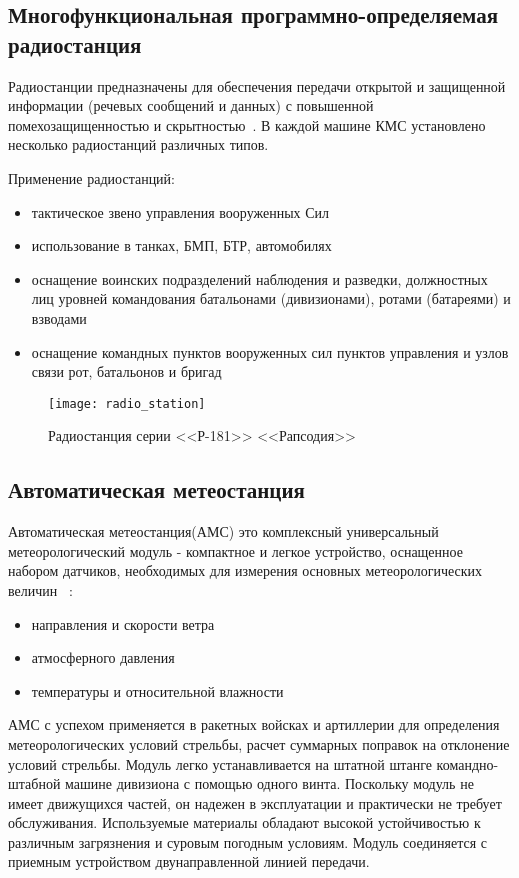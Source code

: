 \subsection{Многофункциональная программно-определяемая радиостанция}
\label{sub:lit_review:radio}

Радиостанции предназначены для обеспечения передачи открытой и защищенной информации (речевых сообщений и данных) с
повышенной помехозащищенностью и скрытностью~\cite{prc9661}.
В каждой машине КМС установлено несколько радиостанций различных типов.

Применение радиостанций:
\begin{itemize}
	\item тактическое звено управления вооруженных Сил
	\item использование в танках, БМП, БТР, автомобилях
	\item оснащение воинских подразделений наблюдения и разведки, должностных лиц уровней командования батальонами (дивизионами), ротами (батареями) и взводами
	\item оснащение командных пунктов вооруженных сил пунктов управления и узлов связи рот, батальонов и бригад
\end{itemize}

\begin{figure}[ht]
	\centering
	\texttt{[image: radio\_station]}
	\caption{Радиостанция серии <<Р-181>> <<Рапсодия>>}
	\label{fig:lit_reiview:meteo:radio_station}
\end{figure}

\subsection{Автоматическая метеостанция}
\label{sub:lit_review:meteo}

Автоматическая метеостанция(АМС) это комплексный универсальный метеорологический модуль - компактное и легкое
устройство, оснащенное набором датчиков, необходимых для измерения основных метеорологических величин ~\cite{wxt530}:
\begin{itemize}
	\item направления и скорости ветра
	\item атмосферного давления
	\item температуры и относительной влажности
\end{itemize}

АМС с успехом применяется в ракетных войсках и артиллерии для определения метеорологических условий стрельбы, расчет суммарных поправок на отклонение условий стрельбы.
Модуль легко устанавливается на штатной штанге командно-штабной машине дивизиона с помощью одного винта.
Поскольку модуль не имеет движущихся частей, он надежен в эксплуатации и практически не требует обслуживания.
Используемые материалы обладают высокой устойчивостью к различным загрязнения и суровым погодным условиям.
Модуль соединяется с приемным устройством двунаправленной линией передачи.

